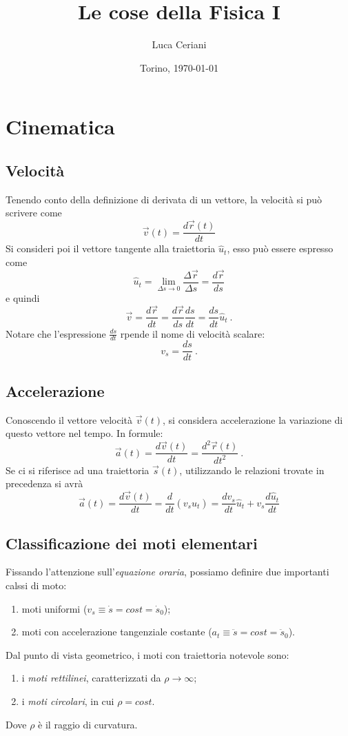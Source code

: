 \documentclass[12pt, oneside]{book}
\title{\vspace*{\fill}\Huge{\textbf{Le cose della Fisica I}}} %
\author{Luca Ceriani\bigskip}
\date{Torino, \today\vspace*{\fill}}
\begin{document}
\maketitle
\thispagestyle{empty}
\newpage

\chapter{Cinematica}

\section{Velocità}
Tenendo conto della definizione di derivata di un vettore, la velocità si può scrivere come
\[\vec{v}(t)=\frac{d\vec{r}(t)}{dt}\]
Si consideri poi il vettore tangente alla traiettoria $\hat{u}_t$, esso può essere espresso come
\[\hat{u}_t=\lim_{\Delta s\rightarrow 0}\dfrac{\Delta\vec{r}}{\Delta s}
= \frac{d\vec{r}}{ds}\]
e quindi
\[\vec{v}=\frac{d\vec{r}}{dt}=\frac{d\vec{r}}{ds}\frac{ds}{dt}=\frac{ds}{dt}\hat{u}_t~.\]
Notare che l'espressione $\frac{ds}{dt}$ rpende il nome di velocità scalare:
\[v_s=\frac{ds}{dt}~.\]

\section{Accelerazione}
Conoscendo il vettore velocità $\vec{v}(t)$, si considera accelerazione la variazione di questo vettore nel tempo. In formule:
\[\vec{a}(t)=\frac{d\vec{v}(t)}{dt}=\frac{d^2 \vec{r}(t)}{dt^2}~.\]
Se ci si riferisce ad una traiettoria $\vec{s}(t)$, utilizzando le relazioni trovate in precedenza si avrà
\[\vec{a}(t)=\frac{d\vec{v}(t)}{dt}=\frac{d}{dt}(v_s \hat{u}_t)=\frac{dv_s}{dt}\hat{u}_t+v_s\frac{d\hat{u}_t}{dt}\]

\section{Classificazione dei moti elementari}
Fissando l'attenzione sull'\textit{equazione oraria}, possiamo definire due importanti calssi di moto:
\begin{enumerate}
	\item moti uniformi ($v_s\equiv \dot{s} = cost = \dot{s}_0$);
	\item{moti con accelerazione tangenziale costante ($a_t\equiv \ddot{s} = cost = \ddot{s}_0$).}
\end{enumerate}
Dal punto di vista geometrico, i moti con traiettoria notevole sono:
\begin{enumerate}
	\item i \emph{moti rettilinei}, caratterizzati da $\rho \rightarrow \infty$;
	\item i \emph{moti circolari}, in cui $\rho = cost$.
\end{enumerate}
Dove $\rho$ è il raggio di curvatura.
\end{document}
